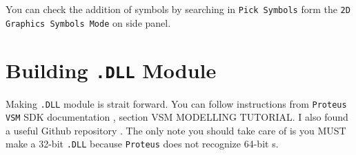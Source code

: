 \documentclass{article}
\begin{document}
You can check the addition of symbols by searching in \texttt{Pick Symbols} form
the \texttt{2D Graphics Symbols Mode} on side panel.


\clearpage
\newpage
\section{Building \texttt{.DLL} Module}

Making \texttt{.DLL} module is strait forward. You can follow instructions from 
\texttt{Proteus VSM} SDK documentation \cite{VSMSDK}, section VSM MODELLING
TUTORIAL. I also found a useful Github repository \cite{LCD12864}. The only note 
you should take care of is you MUST make a 32-bit \texttt{.DLL} because
\texttt{Proteus} does not recognize 64-bit s.


\pagestyle{empty}
{
\small
\onehalfspacing


}



\end{document}
